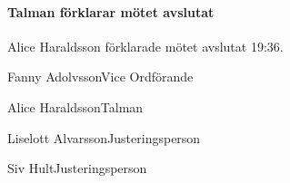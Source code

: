 \documentclass{dsekminutes}
\begin{document}
\paragraph{Talman förklarar mötet avslutat}
Alice Haraldsson förklarade mötet avslutat 19:36.

\vspace{5cm}

\signature{Vid protokollet}{Fanny Adolvsson}{Vice Ordförande}
\signature{Mötesordförande}{Alice Haraldsson}{Talman}
\signature{Justeras}{Liselott Alvarsson}{Justeringsperson}
\signature{Justeras}{Siv Hult}{Justeringsperson}
\end{document}
